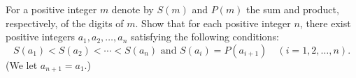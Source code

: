 For a positive integer $m$ denote by $S(m)$ and $P(m)$ the sum and product, respectively, of the digits of $m$. Show that for each positive integer $n$, there exist positive integers $a_1, a_2, \ldots, a_n$ satisfying the following conditions: \[ S(a_1) < S(a_2) < \cdots < S(a_n) \text{ and } S(a_i) = P(a_{i+1}) \quad (i=1,2,\ldots,n). \] (We let $a_{n+1} = a_1$.)